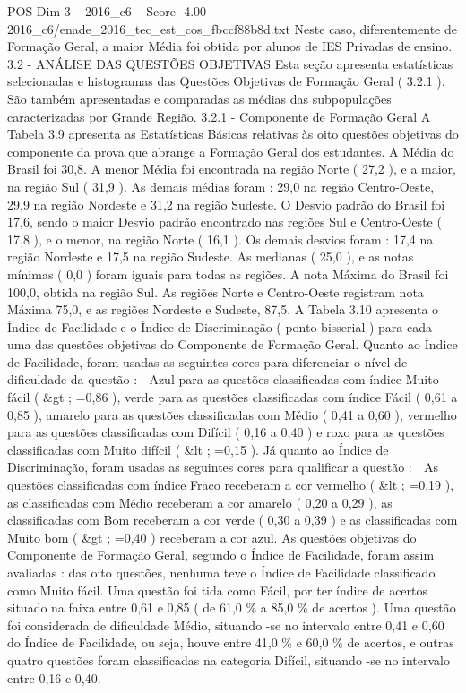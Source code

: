 \begin{textsample}{POS Dim 3 – 2016\_c6 – Score -4.00 – 2016\_c6/enade\_2016\_tec\_est\_cos\_fbccf88b8d.txt}
Neste caso, diferentemente de Formação Geral, a maior Média foi obtida por alunos de IES Privadas de ensino. 3.2 - ANÁLISE DAS QUESTÕES OBJETIVAS Esta seção apresenta estatísticas selecionadas e histogramas das Questões Objetivas de Formação Geral ( 3.2.1 ).
São também apresentadas e comparadas as médias das subpopulações caracterizadas por Grande Região. 3.2.1 - Componente de Formação Geral A Tabela 3.9 apresenta as Estatísticas Básicas relativas às oito questões objetivas do componente da prova que abrange a Formação Geral dos estudantes.
A Média do Brasil foi 30,8.
A menor Média foi encontrada na região Norte ( 27,2 ), e a maior, na região Sul ( 31,9 ).
As demais médias foram : 29,0 na região Centro-Oeste, 29,9 na região Nordeste e 31,2 na região Sudeste.
O Desvio padrão do Brasil foi 17,6, sendo o maior Desvio padrão encontrado nas regiões Sul e Centro-Oeste ( 17,8 ), e o menor, na região Norte ( 16,1 ).
Os demais desvios foram : 17,4 na região Nordeste e 17,5 na região Sudeste.
As medianas ( 25,0 ), e as notas mínimas ( 0,0 ) foram iguais para todas as regiões.
A nota Máxima do Brasil foi 100,0, obtida na região Sul.
As regiões Norte e Centro-Oeste registram nota Máxima 75,0, e as regiões Nordeste e Sudeste, 87,5.
A Tabela 3.10 apresenta o Índice de Facilidade e o Índice de Discriminação ( ponto-bisserial ) para cada uma das questões objetivas do Componente de Formação Geral.
Quanto ao Índice de Facilidade, foram usadas as seguintes cores para diferenciar o nível de dificuldade da questão :  Azul para as questões classificadas com índice Muito fácil ( \&gt ; =0,86 ), verde para as questões classificadas com índice Fácil ( 0,61 a 0,85 ), amarelo para as questões classificadas com Médio ( 0,41 a 0,60 ), vermelho para as questões classificadas com Difícil ( 0,16 a 0,40 ) e roxo para as questões classificadas com Muito difícil ( \&lt ; =0,15 ).
Já quanto ao Índice de Discriminação, foram usadas as seguintes cores para qualificar a questão :  As questões classificadas com índice Fraco receberam a cor vermelho ( \&lt ; =0,19 ), as classificadas com Médio receberam a cor amarelo ( 0,20 a 0,29 ), as classificadas com Bom receberam a cor verde ( 0,30 a 0,39 ) e as classificadas com Muito bom ( \&gt ; =0,40 ) receberam a cor azul.
As questões objetivas do Componente de Formação Geral, segundo o Índice de Facilidade, foram assim avaliadas : das oito questões, nenhuma teve o Índice de Facilidade classificado como Muito fácil.
Uma questão foi tida como Fácil, por ter índice de acertos situado na faixa entre 0,61 e 0,85 ( de 61,0 \% a 85,0 \% de acertos ).
Uma questão foi considerada de dificuldade Médio, situando -se no intervalo entre 0,41 e 0,60 do Índice de Facilidade, ou seja, houve entre 41,0 \% e 60,0 \% de acertos, e outras quatro questões foram classificadas na categoria Difícil, situando -se no intervalo entre 0,16 e 0,40.

\end{textsample}
